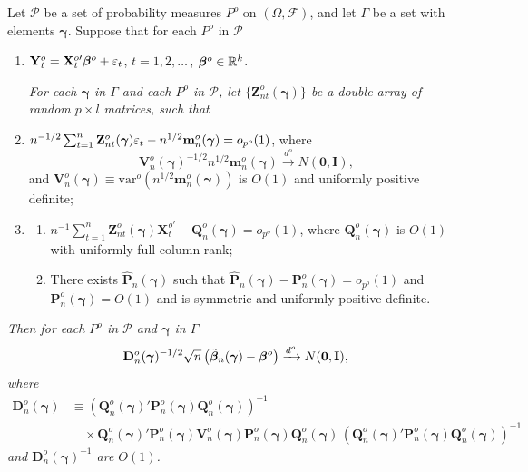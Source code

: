 \begin{theorem}\label{thm:4.54}
Let $\mathcal{P}$ be a set of probability measures $P^o$ on $(\Omega, \mathcal{F})$, and let $\Gamma$ be a set with elements $\boldsymbol{\gamma}$. Suppose that for each $P^o$ in $\mathcal{P}$
\begin{enumerate}[label=(\roman*)]
\item $\mathbf{Y}_t^o = \mathbf{X}_t^{o\prime}\boldsymbol{\beta}^o + \varepsilon_t$, \quad $t = 1, 2, \ldots$\,, $\boldsymbol{\beta}^o \in \mathbb{R}^k$.

\emph{For each $\boldsymbol{\gamma}$ in $\Gamma$ and each $P^o$ in $\mathcal{P}$, let $\{\mathbf{Z}_{nt}^o(\boldsymbol{\gamma})\}$ be a double array of random $p \times l$ matrices, such that}

\item $n^{-1/2}\sum_{t=1}^{n}\mathbf{Z}_{nt}^o(\boldsymbol{\gamma})\varepsilon_t - n^{1/2}\mathbf{m}_n^o(\boldsymbol{\gamma}) = o_{p^o}(1)$, where
\[
\mathbf{V}_n^o(\boldsymbol{\gamma})^{-1/2}n^{1/2}\mathbf{m}_n^o(\boldsymbol{\gamma}) \xrightarrow{d^o} N(\mathbf{0}, \mathbf{I}),
\]
and $\mathbf{V}_n^o(\boldsymbol{\gamma}) \equiv \mathrm{var}^o(n^{1/2}\mathbf{m}_n^o(\boldsymbol{\gamma}))$ is $O(1)$ and uniformly positive definite;

\item \begin{enumerate}[label=(\alph*)]
\item $n^{-1}\sum_{t=1}^{n}\mathbf{Z}_{nt}^o(\boldsymbol{\gamma})\mathbf{X}_t^{o\prime} - \mathbf{Q}_n^o(\boldsymbol{\gamma}) = o_{p^o}(1)$, where $\mathbf{Q}_n^o(\boldsymbol{\gamma})$ is $O(1)$ with uniformly full column rank;
\item There exists $\hat{\mathbf{P}}_n(\boldsymbol{\gamma})$ such that $\hat{\mathbf{P}}_n(\boldsymbol{\gamma}) - \mathbf{P}_n^o(\boldsymbol{\gamma}) = o_{p^o}(1)$ and $\mathbf{P}_n^o(\boldsymbol{\gamma}) = O(1)$ and is symmetric and uniformly positive definite.
\end{enumerate}
\end{enumerate}

\emph{Then for each $P^o$ in $\mathcal{P}$ and $\boldsymbol{\gamma}$ in $\Gamma$}
\[
\mathbf{D}_n^o(\boldsymbol{\gamma})^{-1/2}\sqrt{n}\left(\tilde{\boldsymbol{\beta}}_n(\boldsymbol{\gamma}) - \boldsymbol{\beta}^o\right) \xrightarrow{d^o} N(\mathbf{0}, \mathbf{I}),
\]
\emph{where}
\begin{align*}
\mathbf{D}_n^o(\boldsymbol{\gamma}) &\equiv (\mathbf{Q}_n^o(\boldsymbol{\gamma})'\mathbf{P}_n^o(\boldsymbol{\gamma})\mathbf{Q}_n^o(\boldsymbol{\gamma}))^{-1} \\
&\quad\times \mathbf{Q}_n^o(\boldsymbol{\gamma})'\mathbf{P}_n^o(\boldsymbol{\gamma})\mathbf{V}_n^o(\boldsymbol{\gamma})\mathbf{P}_n^o(\boldsymbol{\gamma})\mathbf{Q}_n^o(\boldsymbol{\gamma})\,(\mathbf{Q}_n^o(\boldsymbol{\gamma})'\mathbf{P}_n^o(\boldsymbol{\gamma})\mathbf{Q}_n^o(\boldsymbol{\gamma}))^{-1}
\end{align*}
\emph{and $\mathbf{D}_n^o(\boldsymbol{\gamma})^{-1}$ are $O(1)$.}
\end{theorem}

